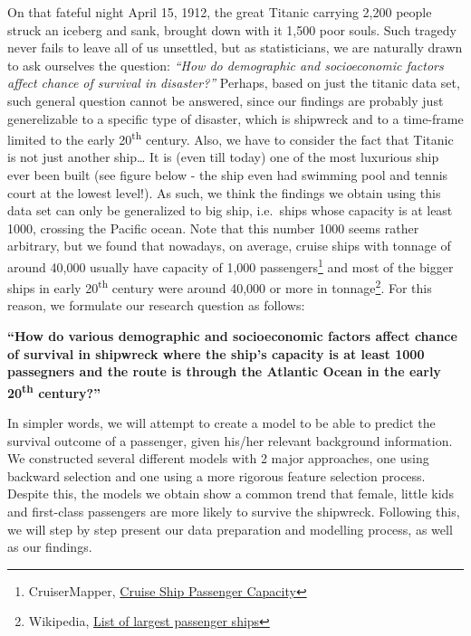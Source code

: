 \documentclass[12pt, oneside]{book}
\begin{document}
On that fateful night April 15, 1912, the great Titanic carrying 2,200
people struck an iceberg and sank, brought down with it 1,500 poor
souls. Such tragedy never fails to leave all of us unsettled, but as
statisticians, we are naturally drawn to ask ourselves the question:
\emph{``How do demographic and socioeconomic factors affect chance of
survival in disaster?''} Perhaps, based on just the titanic data set,
such general question cannot be answered, since our findings are
probably just generelizable to a specific type of disaster, which is
shipwreck and to a time-frame limited to the early
20\textsuperscript{th} century. Also, we have to consider the fact that
Titanic is not just another ship\ldots{} It is (even till today) one of
the most luxurious ship ever been built (see figure below - the ship
even had swimming pool and tennis court at the lowest level!). As such,
we think the findings we obtain using this data set can only be
generalized to big ship, i.e.~ships whose capacity is at least 1000,
crossing the Pacific ocean. Note that this number 1000 seems rather
arbitrary, but we found that nowadays, on average, cruise ships with
tonnage of around 40,000 usually have capacity of 1,000
passengers\footnote{CruiserMapper,
  \href{http://www.cruisemapper.com/wiki/761-cruise-ship-passenger-capacity-ratings}{Cruise
  Ship Passenger Capacity}} and most of the bigger ships in early
20\textsuperscript{th} century were around 40,000 or more in
tonnage\footnote{Wikipedia,
  \href{https://en.wikipedia.org/wiki/List_of_largest_passenger_ships}{List
  of largest passenger ships}}. For this reason, we formulate our
research question as follows:

\textbf{``How do various demographic and socioeconomic factors affect
chance of survival in shipwreck where the ship's capacity is at least
1000 passegners and the route is through the Atlantic Ocean in the early
20\textsuperscript{th} century?''}

In simpler words, we will attempt to create a model to be able to
predict the survival outcome of a passenger, given his/her relevant
background information. We constructed several different models with 2
major approaches, one using backward selection and one using a more
rigorous feature selection process. Despite this, the models we obtain
show a common trend that female, little kids and first-class passengers
are more likely to survive the shipwreck. Following this, we will step
by step present our data preparation and modelling process, as well as
our findings.
\end{document}
